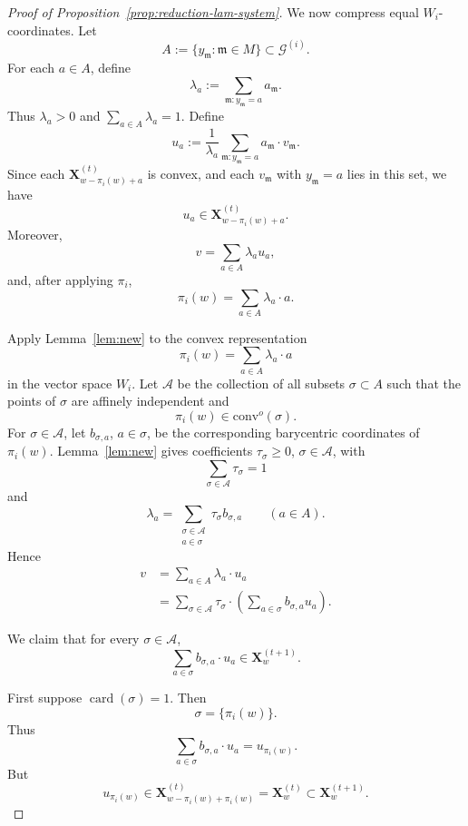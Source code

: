 \documentclass[10pt]{amsart}
\theoremstyle{plain}
\theoremstyle{definition}
\providecommand{\cG}[0]{\ensuremath{\mathcal G}\xspace}
\providecommand{\bX}[0]{\ensuremath{\mathbf X}\xspace}
\let\geq\geqslant
\providecommand{\convo}[1]{\ensuremath{\mathrm{conv}^o{\left({#1}\right)}\xspace}}
\newcommand{\fm}{\mathfrak{m}}
\begin{document}
\begin{proof}[Proof of Proposition~\ref{prop:reduction-lam-system}]
We now compress equal \(W_i\)-coordinates. Let
\[
        A:=\{y_\fm:\fm\in M\}\subset \cG^{(i)}.
\]
For each \(a\in A\), define
\[
        \lambda_a:=\sum_{\fm:y_\fm=a}a_\fm.
\]
Thus \(\lambda_a>0\) and \(\sum_{a\in A}\lambda_a=1\).  Define
\[
        u_a:=\frac{1}{\lambda_a}
        \sum_{\fm:y_\fm=a}a_\fm \cdot v_\fm.
\]
Since each \(\bX_{w-\pi_i(w)+a}^{(t)}\) is convex, and each
\(v_\fm\) with \(y_\fm=a\) lies in this set, we have
\[
        u_a\in \bX_{w-\pi_i(w)+a}^{(t)}.
\]
Moreover,
\[
        v=\sum_{a\in A}\lambda_a u_a,
\]
and, after applying \(\pi_i\),
\[
        \pi_i(w)=\sum_{a\in A}\lambda_a \cdot a.
\]

Apply Lemma~\ref{lem:new} to the convex representation
\[
        \pi_i(w)=\sum_{a\in A}\lambda_a  \cdot a
\]
in the vector space \(W_i\).  Let \(\mathcal A\) be the collection of
all subsets \(\sigma\subset A\) such that the points of \(\sigma\) are
affinely independent and
\[
        \pi_i(w)\in 
        \convo{\sigma}.
\]
For \(\sigma\in\mathcal A\), let \(b_{\sigma,a}\), \(a\in\sigma\), be
the corresponding barycentric coordinates of \(\pi_i(w)\).  Lemma~\ref{lem:new}
gives coefficients \(\tau_\sigma\geq 0\), \(\sigma\in\mathcal A\), with
\[
        \sum_{\sigma\in\mathcal A}\tau_\sigma=1
\]
and
\[
        \lambda_a
        =
        \sum_{\substack{\sigma\in\mathcal A\\ a\in\sigma}}
        \tau_\sigma b_{\sigma,a}
        \qquad(a\in A).
\]
Hence
\[
\begin{aligned}
        v
        &=
        \sum_{a\in A}\lambda_a \cdot u_a                                      \\
        &=
        \sum_{\sigma\in\mathcal A}
        \tau_\sigma \cdot
        \left( \sum_{a\in\sigma}b_{\sigma,a}u_a \right).
\end{aligned}
\]

We claim that for every \(\sigma\in\mathcal A\),
\[
        \sum_{a\in\sigma}b_{\sigma,a} \cdot u_a\in \bX_w^{(t+1)}.
\]

First suppose \(\operatorname{card}(\sigma)=1\).  Then
\[
        \sigma=\{\pi_i(w)\}.
\]
Thus
\[
        \sum_{a\in\sigma}b_{\sigma,a} \cdot u_a
        =
        u_{\pi_i(w)}.
\]
But
\[
        u_{\pi_i(w)}
        \in \bX_{w-\pi_i(w)+\pi_i(w)}^{(t)}
        =
        \bX_w^{(t)}
        \subset \bX_w^{(t+1)}.
\]


\end{proof}
\end{document}
